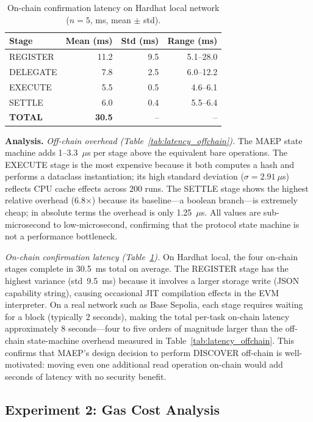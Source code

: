 \documentclass[conference]{IEEEtran}
\begin{document}
\begin{table}[h]
\caption{On-chain confirmation latency on Hardhat local network
         ($n=5$, ms, mean $\pm$ std).}
\label{tab:latency_onchain}
\centering
\begin{tabular}{lrrr}
\toprule
\textbf{Stage} & \textbf{Mean (ms)} & \textbf{Std (ms)} & \textbf{Range (ms)} \\
\midrule
REGISTER & 11.2 & 9.5  & 5.1--28.0 \\
DELEGATE &  7.8 & 2.5  & 6.0--12.2 \\
EXECUTE  &  5.5 & 0.5  & 4.6--6.1  \\
SETTLE   &  6.0 & 0.4  & 5.5--6.4  \\
\midrule
\textbf{TOTAL} & \textbf{30.5} & -- & -- \\
\bottomrule
\end{tabular}
\end{table}

\textbf{Analysis.}
\emph{Off-chain overhead (Table~\ref{tab:latency_offchain}).}
The MAEP state machine adds 1--3.3~$\mu$s per stage above the
equivalent bare operations.  The EXECUTE stage is the most expensive
because it both computes a hash and performs a dataclass instantiation;
its high standard deviation ($\sigma = 2.91~\mu$s) reflects CPU cache
effects across 200 runs.  The SETTLE stage shows the highest relative
overhead (6.8$\times$) because its baseline---a boolean branch---is
extremely cheap; in absolute terms the overhead is only 1.25~$\mu$s.
All values are sub-microsecond to low-microsecond, confirming that the
protocol state machine is not a performance bottleneck.

\emph{On-chain confirmation latency (Table~\ref{tab:latency_onchain}).}
On Hardhat local, the four on-chain stages complete in 30.5~ms total on
average.  The REGISTER stage has the highest variance (std~9.5~ms)
because it involves a larger storage write (JSON capability string),
causing occasional JIT compilation effects in the EVM interpreter.
On a real network such as Base Sepolia, each stage requires waiting for
a block (typically 2 seconds), making the total per-task on-chain
latency approximately 8 seconds---four to five orders of magnitude
larger than the off-chain state-machine overhead measured in
Table~\ref{tab:latency_offchain}.  This confirms that MAEP's design
decision to perform DISCOVER off-chain is well-motivated: moving even
one additional read operation on-chain would add seconds of latency
with no security benefit.

\subsection{Experiment 2: Gas Cost Analysis}
\end{document}
